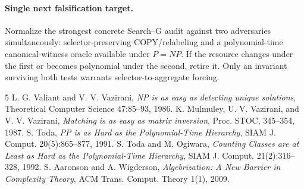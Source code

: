 \documentclass[11pt]{article}
\begin{document}
\paragraph{Single next falsification target.} Normalize the strongest concrete Search--G audit against two adversaries simultaneously: selector-preserving COPY/relabeling and a polynomial-time canonical-witness oracle available under $P=NP$. If the resource changes under the first or becomes polynomial under the second, retire it. Only an invariant surviving both tests warrants selector-to-aggregate forcing.

\begin{thebibliography}{5}
 L. G. Valiant and V. V. Vazirani, \emph{NP is as easy as detecting unique solutions}, Theoretical Computer Science 47:85--93, 1986.
 K. Mulmuley, U. V. Vazirani, and V. V. Vazirani, \emph{Matching is as easy as matrix inversion}, Proc. STOC, 345--354, 1987.
 S. Toda, \emph{PP is as Hard as the Polynomial-Time Hierarchy}, SIAM J. Comput. 20(5):865--877, 1991.
 S. Toda and M. Ogiwara, \emph{Counting Classes are at Least as Hard as the Polynomial-Time Hierarchy}, SIAM J. Comput. 21(2):316--328, 1992.
 S. Aaronson and A. Wigderson, \emph{Algebrization: A New Barrier in Complexity Theory}, ACM Trans. Comput. Theory 1(1), 2009.
\end{thebibliography}
\end{document}

